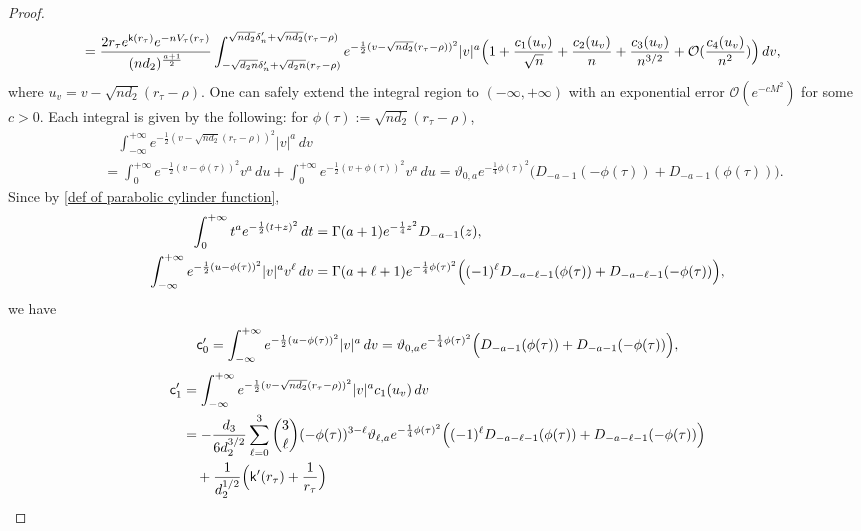 \documentclass[reqno]{amsart}
\newcommand{\1}{\mathds{1}}
\numberwithin{equation}{section}
\theoremstyle{definition}
\begin{document}
\begin{proof}
\begin{align*}
&=
\frac{2r_{\tau}e^{\mathsf{k}(r_{\tau})}e^{-nV_{\tau}(r_{\tau})}}{(nd_2)^{\frac{a+1}{2}}}
\int_{-\sqrt{d_2n}\delta_n'+\sqrt{d_2n}(r_{\tau}-\rho)}^{\sqrt{nd_2}\delta_n'+\sqrt{nd_2}(r_{\tau}-\rho)}
e^{-\frac{1}{2}(v-\sqrt{nd_2}(r_{\tau}-\rho))^2}
|v|^{a}
\Bigl( 
1+\frac{c_1(u_v)}{\sqrt{n}}+\frac{c_2(u_v)}{n}+\frac{c_3(u_v)}{n^{3/2}}+\mathcal{O}(\frac{c_4(u_v)}{n^2})
\Bigr)\,dv,
\end{align*}
where $u_v=v-\sqrt{nd_2}(r_{\tau}-\rho)$. 
One can safely extend the integral region to $(-\infty,+\infty)$ with an exponential error $\mathcal{O}(e^{-cM^2})$ for some $c>0$. 
Each integral is given by the following: for $\phi(\tau):=\sqrt{nd_2}(r_{\tau}-\rho)$, 
\begin{align*}
&\quad\int_{-\infty}^{+\infty}
e^{-\frac{1}{2}(v-\sqrt{nd_2}(r_{\tau}-\rho))^2}
|v|^{a}\,dv
\\
&=
\int_{0}^{+\infty}
e^{-\frac{1}{2}(v-\phi(\tau))^2}
v^{a}\,du
+\int_{0}^{+\infty}
e^{-\frac{1}{2}(v+\phi(\tau))^2}
v^{a}\,du
=\vartheta_{0,a}e^{-\frac{1}{4}\phi(\tau)^2}\bigl( 
D_{-a-1}(-\phi(\tau))+D_{-a-1}(\phi(\tau))
\bigr). 
\end{align*}
Since by \eqref{def of parabolic cylinder function}, 
\begin{align*}
\int_{0}^{+\infty}t^{a}e^{-\frac{1}{2}(t+z)^2}\,dt
&=\Gamma(a+1)e^{-\frac{1}{4}z^2}D_{-a-1}(z), 
\\
\int_{-\infty}^{+\infty}e^{-\frac{1}{2}(u-\phi(\tau))^2}|v|^{a}v^{\ell}\,dv
&=
\Gamma(a+\ell+1)e^{-\frac{1}{4}\phi(\tau)^2}
\Bigl( 
(-1)^{\ell}D_{-a-\ell-1}(\phi(\tau))
+
D_{-a-\ell-1}(-\phi(\tau))
\Bigr), 
\end{align*}
we have 
\begin{equation}
\label{def of sfcd0}
\mathsf{c}_0'=   
\int_{-\infty}^{+\infty}e^{-\frac{1}{2}(u-\phi(\tau))^2}|v|^{a}\,dv
=
\vartheta_{0,a}e^{-\frac{1}{4}\phi(\tau)^2}
\Bigl( 
D_{-a-1}(\phi(\tau))
+
D_{-a-1}(-\phi(\tau))
\Bigr), 
\end{equation}
\begin{align}
\begin{split}
\label{def of sfcd1}
\mathsf{c}_1'&=\int_{-\infty}^{+\infty}
e^{-\frac{1}{2}(v-\sqrt{nd_2}(r_{\tau}-\rho))^2}
|v|^{a}
c_1(u_v)\,dv
\\
&=
-\frac{d_3}{6d_2^{3/2}}\sum_{\ell=0}^{3}\binom{3}{\ell}(-\phi(\tau))^{3-\ell}
\vartheta_{\ell,a}e^{-\frac{1}{4}\phi(\tau)^2}
\Bigl( 
(-1)^{\ell}D_{-a-\ell-1}(\phi(\tau))
+
D_{-a-\ell-1}(-\phi(\tau))
\Bigr)
\\ &\quad
+\frac{1}{d_2^{1/2}}\Bigl(\mathsf{k}'(r_{\tau})+\frac{1}{r_{\tau}}\Bigr)

\end{split}
\end{align}
\end{proof}
\end{document}
